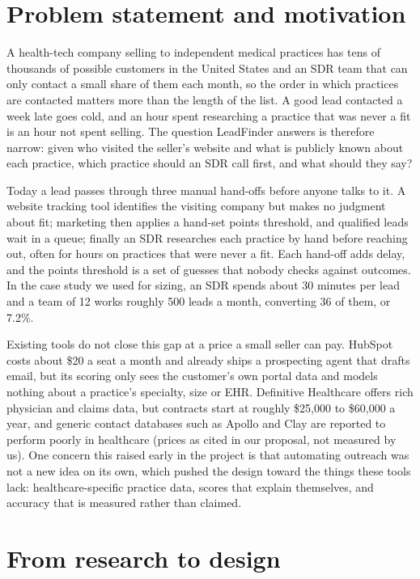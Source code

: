 \documentclass[11pt]{article}
\begin{document}
\section{Problem statement and motivation}

A health-tech company selling to independent medical practices has tens of thousands of possible customers in the United States and an SDR team that can only contact a small share of them each month, so the order in which practices are contacted matters more than the length of the list. A good lead contacted a week late goes cold, and an hour spent researching a practice that was never a fit is an hour not spent selling. The question LeadFinder answers is therefore narrow: given who visited the seller's website and what is publicly known about each practice, which practice should an SDR call first, and what should they say?

Today a lead passes through three manual hand-offs before anyone talks to it. A website tracking tool identifies the visiting company but makes no judgment about fit; marketing then applies a hand-set points threshold, and qualified leads wait in a queue; finally an SDR researches each practice by hand before reaching out, often for hours on practices that were never a fit. Each hand-off adds delay, and the points threshold is a set of guesses that nobody checks against outcomes. In the case study we used for sizing, an SDR spends about 30 minutes per lead and a team of 12 works roughly 500 leads a month, converting 36 of them, or 7.2\%.

Existing tools do not close this gap at a price a small seller can pay. HubSpot costs about \$20 a seat a month and already ships a prospecting agent that drafts email, but its scoring only sees the customer's own portal data and models nothing about a practice's specialty, size or EHR. Definitive Healthcare offers rich physician and claims data, but contracts start at roughly \$25,000 to \$60,000 a year, and generic contact databases such as Apollo and Clay are reported to perform poorly in healthcare (prices as cited in our proposal, not measured by us). One concern this raised early in the project is that automating outreach was not a new idea on its own, which pushed the design toward the things these tools lack: healthcare-specific practice data, scores that explain themselves, and accuracy that is measured rather than claimed.

\section{From research to design}
\end{document}
